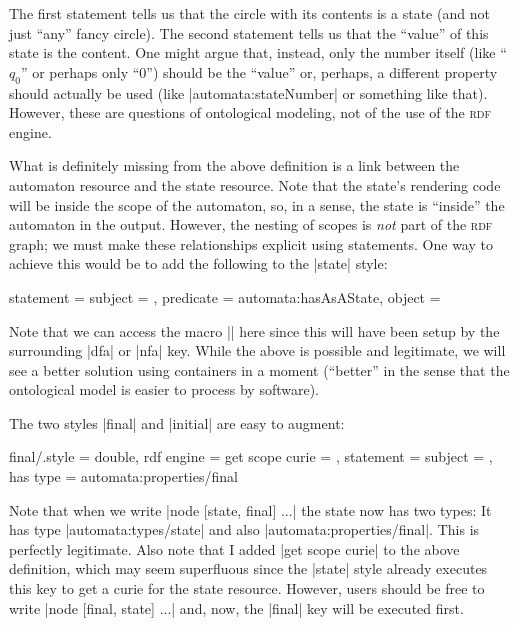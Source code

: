 The first statement tells us that the circle with its contents is a state (and
not just ``any'' fancy circle). The second statement tells us that the
``value'' of this state is the content. One might argue that, instead, only the
number itself (like ``$q_0$'' or perhaps only ``$0$'') should be the ``value''
or, perhaps, a different property should actually be used (like
|automata:stateNumber| or something like that). However, these are questions of
ontological modeling, not of the use of the \textsc{rdf} engine.

What is definitely missing from the above definition is a link between the
automaton resource and the state resource. Note that the state's rendering code
will be inside the scope of the automaton, so, in a sense, the state is
``inside'' the automaton in the output. However, the nesting of scopes is
\emph{not} part of the \textsc{rdf} graph; we must make these relationships
explicit using statements. One way to achieve this would be to add the
following to the |state| style:
%
\begin{codeexample}
    statement = {
      subject     = \mylibAutomatonCurie,
      predicate   = automata:hasAsAState,
      object      = \mylibStateCurie }
\end{codeexample}

Note that we can access the macro |\mylibAutomatonCurie| here since this will
have been setup by the surrounding |dfa| or |nfa| key. While the above is
possible and legitimate, we will see a better solution using containers in a
moment (``better'' in the sense that the ontological model is easier to process
by software).

The two styles |final| and |initial| are easy to augment:
%
\begin{codeexample}
final/.style = {
  double, %
  rdf engine = {
    get scope curie = \mylibStateCurie,
    statement = {
      subject     = \mylibStateCurie,
      has type    = automata:properties/final } } }
\end{codeexample}

Note that when we write |node [state, final] ...| the state now has two types:
It has type |automata:types/state| and also |automata:properties/final|. This
is perfectly legitimate. Also note that I added |get scope curie| to the above
definition, which may seem superfluous since the |state| style already executes
this key to get a curie for the state resource. However, users should be free
to write |node [final, state] ...| and, now, the |final| key will be executed
first.

